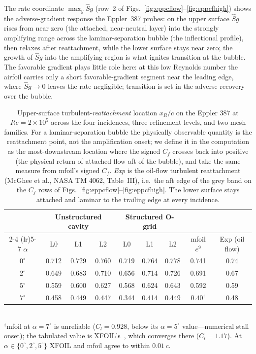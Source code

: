 \documentclass[journal]{new-aiaa}
\begin{document}
The rate coordinate $\max_y \hat S g$ (row~2 of
Figs.~\ref{fig:eppcflow}--\ref{fig:eppcfhigh}) shows the adverse-gradient
response the Eppler~387 probes: on the upper surface $\hat S g$ rises from near zero
(the attached, near-neutral layer) into the strongly amplifying range across
the laminar-separation bubble (the inflectional profile), then relaxes after
reattachment, while the lower surface stays near zero; the growth of $\hat S g$ into
the amplifying region is what ignites transition at the bubble. The favorable gradient plays little role
here: at this low Reynolds number the airfoil carries only a short
favorable-gradient segment near the leading edge, where $\hat S g\!\to\!0$ leaves the
rate negligible; transition is set in the adverse recovery over the bubble.

\begin{table}[tp]
  \centering
  \caption{Upper-surface turbulent-\emph{reattachment} location $x_R/c$ on the
  Eppler 387 at $Re\!=\!2\!\times\!10^5$ across the four incidences, three
  refinement levels, and two mesh families. For a laminar-separation bubble the
  physically observable quantity is the reattachment point, not the amplification
  onset; we define it in the computation as the most-downstream location where the
  signed $C_f$ crosses back into positive (the physical return of attached flow aft
  of the bubble), and take the same measure from mfoil's signed $C_f$. \emph{Exp}
  is the oil-flow turbulent reattachment (McGhee et al., NASA TM 4062, Table~III),
  i.e.\ the aft edge of the grey band on the $C_f$ rows of
  Figs.~\ref{fig:eppcflow}--\ref{fig:eppcfhigh}. The lower surface stays attached
  and laminar to the trailing edge at every incidence.}
  \label{tab:eppxtr}
  \begin{tabular}{ccccccccc}
    \toprule
    & \multicolumn{3}{c}{Unstructured cavity} & \multicolumn{3}{c}{Structured O-grid} & & \\
    \cmidrule(lr){2-4} \cmidrule(lr){5-7}
    $\alpha$ & L0 & L1 & L2 & L0 & L1 & L2 & mfoil $e^9$ & Exp (oil flow) \\
    \midrule
    $0^\circ$ & 0.712 & 0.729 & 0.760 & 0.719 & 0.764 & 0.778 & 0.741 & 0.74 \\
    $2^\circ$ & 0.649 & 0.683 & 0.710 & 0.656 & 0.714 & 0.726 & 0.691 & 0.67 \\
    $5^\circ$ & 0.559 & 0.600 & 0.627 & 0.568 & 0.624 & 0.643 & 0.592 & 0.59 \\
    $7^\circ$ & 0.458 & 0.449 & 0.447 & 0.344 & 0.414 & 0.449 & $0.40^\dagger$ & 0.48 \\
    \bottomrule
  \end{tabular}
  \\[2pt]{\footnotesize $^\dagger$mfoil at $\alpha\!=\!7^\circ$ is unreliable
  ($C_l\!=\!0.928$, below its $\alpha\!=\!5^\circ$ value---numerical stall onset);
  the tabulated value is XFOIL's~\cite{drela_xfoil_1989}, which converges
  there ($C_l\!=\!1.17$). At $\alpha\!\in\!\{0^\circ,2^\circ,5^\circ\}$ XFOIL and
  mfoil agree to within $0.01\,c$.}
\end{table}
\end{document}
